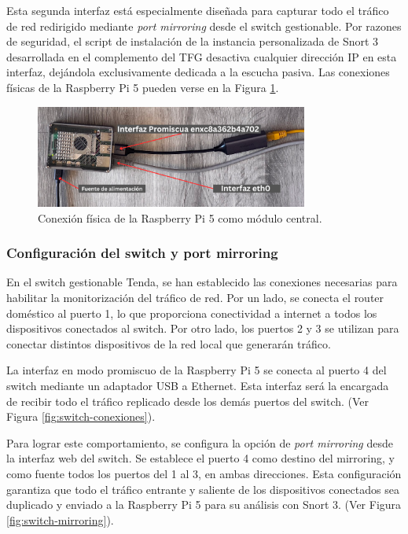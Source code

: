 \documentclass[11pt,a4paper,twoside]{report}
\begin{document}
Esta segunda interfaz está especialmente diseñada para capturar todo el tráfico de red redirigido mediante \textit{port mirroring} desde el switch gestionable. Por razones de seguridad, el script de instalación de la instancia personalizada de Snort 3 desarrollada en el complemento del TFG desactiva cualquier dirección IP en esta interfaz, dejándola exclusivamente dedicada a la escucha pasiva. Las conexiones físicas de la Raspberry Pi 5 pueden verse en la Figura \ref{fig:conexion-central-rpi5}.

\begin{figure}[H]
	\centering
	\includegraphics[width=0.8\textwidth]{install/0.1.png}
	\caption{Conexión física de la Raspberry Pi 5 como módulo central.}
	\label{fig:conexion-central-rpi5}
\end{figure}


\subsubsection{Configuración del switch y port mirroring}

En el switch gestionable Tenda, se han establecido las conexiones necesarias para habilitar la monitorización del tráfico de red. Por un lado, se conecta el router doméstico al puerto 1, lo que proporciona conectividad a internet a todos los dispositivos conectados al switch. Por otro lado, los puertos 2 y 3 se utilizan para conectar distintos dispositivos de la red local que generarán tráfico.\newline

La interfaz en modo promiscuo de la Raspberry Pi 5 se conecta al puerto 4 del switch mediante un adaptador USB a Ethernet. Esta interfaz será la encargada de recibir todo el tráfico replicado desde los demás puertos del switch. (Ver Figura \ref{fig:switch-conexiones}).\newline

Para lograr este comportamiento, se configura la opción de \textit{port mirroring} desde la interfaz web del switch. Se establece el puerto 4 como destino del mirroring, y como fuente todos los puertos del 1 al 3, en ambas direcciones. Esta configuración garantiza que todo el tráfico entrante y saliente de los dispositivos conectados sea duplicado y enviado a la Raspberry Pi 5 para su análisis con Snort 3. (Ver Figura \ref{fig:switch-mirroring}).
\end{document}

